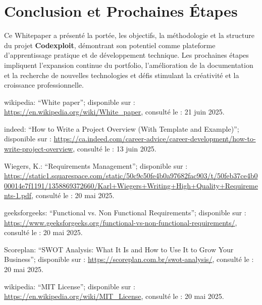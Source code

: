 \documentclass[10pt, a4paper, oneside]{article}
\begin{document}
\section{Conclusion et Prochaines Étapes}

Ce Whitepaper a présenté la portée, les objectifs, la méthodologie et la structure du projet \textbf{Codexploit}, démontrant son potentiel comme plateforme d’apprentissage pratique et de développement technique. Les prochaines étapes impliquent l’expansion continue du portfolio, l’amélioration de la documentation et la recherche de nouvelles technologies et défis stimulant la créativité et la croissance professionnelle.\newpage

%

\begin{thebibliography}{}{
\fontsize{9pt}{10pt}\selectfont

wikipedia: ``White paper''; disponible sur : \url{https://en.wikipedia.org/wiki/White_paper}, consulté le : 21 juin 2025.

indeed: ``How to Write a Project Overview (With Template and Example)''; disponible sur : \url{https://ca.indeed.com/career-advice/career-development/how-to-write-project-overview}, consulté le : 13 juin 2025.

Wiegers, K.: ``Requirements Management''; disponible sur : \url{https://static1.squarespace.com/static/50c9c50fe4b0a97682fac903/t/50feb37ce4b000014e7f1191/1358869372660/Karl+Wiegers+Writing+High+Quality+Requirements-1.pdf}, consulté le : 20 mai 2025.

geeksforgeeks: ``Functional vs. Non Functional Requirements''; disponible sur : \url{https://www.geeksforgeeks.org/functional-vs-non-functional-requirements/}, consulté le : 20 mai 2025.

Scoreplan: ``SWOT Analysis: What It Is and How to Use It to Grow Your Business''; disponible sur : \url{https://scoreplan.com.br/swot-analysis/}, consulté le : 20 mai 2025.

wikipedia: ``MIT License''; disponible sur : \url{https://en.wikipedia.org/wiki/MIT_License}, consulté le : 20 mai 2025.

}
\end{thebibliography}
\end{document}
